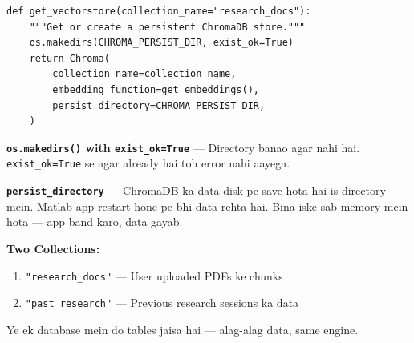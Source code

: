 \documentclass[12pt, a4paper]{article}
\begin{document}
\begin{lstlisting}[style=pythonstyle, title={\color{accentgreen}\faIcon{file} Vector Store Access}]
def get_vectorstore(collection_name="research_docs"):
    """Get or create a persistent ChromaDB store."""
    os.makedirs(CHROMA_PERSIST_DIR, exist_ok=True)
    return Chroma(
        collection_name=collection_name,
        embedding_function=get_embeddings(),
        persist_directory=CHROMA_PERSIST_DIR,
    )
\end{lstlisting}

\begin{codestorybox}
\textbf{\texttt{os.makedirs()} with \texttt{exist\_ok=True}} --- Directory banao agar nahi hai. \texttt{exist\_ok=True} se agar already hai toh error nahi aayega.

\textbf{\texttt{persist\_directory}} --- ChromaDB ka data disk pe save hota hai is directory mein. Matlab app restart hone pe bhi data rehta hai. Bina iske sab memory mein hota --- app band karo, data gayab.

\textbf{Two Collections:}
\begin{enumerate}
\item \texttt{"research\_docs"} --- User uploaded PDFs ke chunks
\item \texttt{"past\_research"} --- Previous research sessions ka data
\end{enumerate}
Ye ek database mein do tables jaisa hai --- alag-alag data, same engine.
\end{codestorybox}
\end{document}
